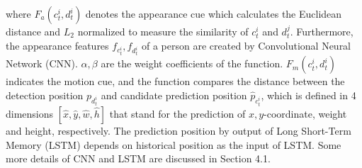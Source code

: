 \documentclass[5pt]{article}
\begin{document}
where $F_a(c_t^i,d_t^i) $ denotes the appearance cue which calculates the Euclidean distance and $L_2$ normalized to measure the similarity of $c_t^i$ and $d_t^j$. Furthermore, the appearance features $f_{c_t^i}, f_{d_t^i}$ of a person are created by Convolutional Neural Network (CNN). $\alpha, \beta$ are the weight coefficients of the function.  $F_m(c_t^i,d_t^i) $ indicates the motion cue, and the function compares the distance between the detection position $p_{d_t^i}$ and candidate prediction position $\hat{p}_{c_t^i}$, which is defined in 4 dimensions $[\hat{x},\hat{y},\hat{w},\hat{h}]$ that stand for the prediction of $x,y$-coordinate, weight and height, respectively. The prediction position by output of Long Short-Term Memory (LSTM) depends on historical position as the input of LSTM. Some more details of CNN and LSTM are discussed in Section 4.1.




\vspace{-0.2cm}
\end{document}
